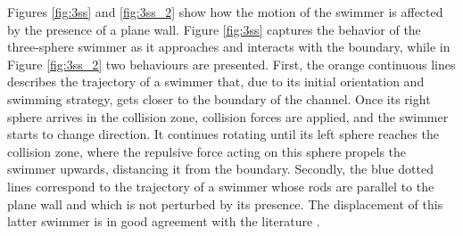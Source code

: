 \documentclass[graybox]{svmult}
\begin{document}
Figures \ref{fig:3ss} and \ref{fig:3ss_2} show how the motion of the swimmer is affected by the presence of a plane wall. Figure \ref{fig:3ss} captures the behavior of the three-sphere swimmer as it approaches and interacts with the boundary, while in Figure \ref{fig:3ss_2} two behaviours are presented. First, the orange continuous lines describes the trajectory of a swimmer that, due to its initial orientation and swimming strategy, gets closer to the boundary of the channel. Once its right sphere arrives in the collision zone, collision forces are applied, and the swimmer starts to change direction. It continues rotating until its left sphere reaches the collision zone, where the repulsive force acting on this sphere propels the swimmer upwards, distancing it from the boundary. 
Secondly, the blue dotted lines correspond to the trajectory of a swimmer whose rods are parallel to the plane wall and which is not perturbed by its presence. The displacement of this latter swimmer is in good agreement with the literature \cite{najafi_simple_2004}.
\end{document}
